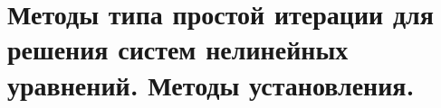 \section{Методы типа простой итерации для решения систем нелинейных уравнений. Методы установления.}
